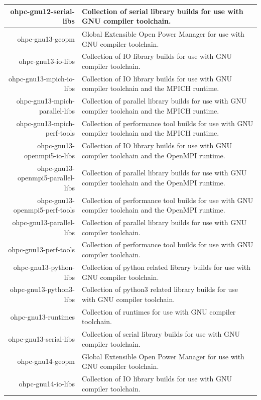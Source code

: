\begin{tabularx}{\textwidth}{r|X}
\hline
ohpc-gnu12-serial-libs & Collection of serial library builds for use with GNU compiler toolchain. \\
\hline
ohpc-gnu13-geopm & Global Extensible Open Power Manager for use with GNU compiler toolchain. \\
\hline
ohpc-gnu13-io-libs & Collection of IO library builds for use with GNU compiler toolchain. \\
\hline
ohpc-gnu13-mpich-io-libs & Collection of IO library builds for use with GNU compiler toolchain and the MPICH runtime. \\
\hline
ohpc-gnu13-mpich-parallel-libs & Collection of parallel library builds for use with GNU compiler toolchain and the MPICH runtime. \\
\hline
ohpc-gnu13-mpich-perf-tools & Collection of performance tool builds for use with GNU compiler toolchain and the MPICH runtime. \\
\hline
ohpc-gnu13-openmpi5-io-libs & Collection of IO library builds for use with GNU compiler toolchain and the OpenMPI runtime. \\
\hline
ohpc-gnu13-openmpi5-parallel-libs & Collection of parallel library builds for use with GNU compiler toolchain and the OpenMPI runtime. \\
\hline
ohpc-gnu13-openmpi5-perf-tools & Collection of performance tool builds for use with GNU compiler toolchain and the OpenMPI runtime. \\
\hline
ohpc-gnu13-parallel-libs & Collection of parallel library builds for use with GNU compiler toolchain. \\
\hline
ohpc-gnu13-perf-tools & Collection of performance tool builds for use with GNU compiler toolchain. \\
\hline
ohpc-gnu13-python-libs & Collection of python related library builds for use with GNU compiler toolchain. \\
\hline
ohpc-gnu13-python3-libs & Collection of python3 related library builds for use with GNU compiler toolchain. \\
\hline
ohpc-gnu13-runtimes & Collection of runtimes for use with GNU compiler toolchain. \\
\hline
ohpc-gnu13-serial-libs & Collection of serial library builds for use with GNU compiler toolchain. \\
\hline
ohpc-gnu14-geopm & Global Extensible Open Power Manager for use with GNU compiler toolchain. \\
\hline
ohpc-gnu14-io-libs & Collection of IO library builds for use with GNU compiler toolchain. \\

\end{tabularx}
